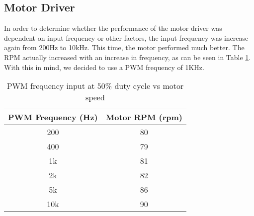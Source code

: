\subsection{Motor Driver}
In order to determine whether the performance of the motor driver was dependent on input frequency or other factors, the input frequency was increase again from 200Hz to 10kHz. This time, the motor performed much better. The RPM actually increased with an increase in frequency, as can be seen in Table \ref{tbl:freq-test}. With this in mind, we decided to use a PWM frequency of 1KHz.
\begin{table}[H]
	\centering
	\caption{PWM frequency input at 50\% duty cycle vs motor speed}
	\begin{tabular}{| c | c |}
		\hline
		PWM Frequency (Hz) & Motor RPM (rpm) \\
		\hline
		200 & 80 \\
		400 & 79 \\
		1k & 81 \\
		2k & 82 \\
		5k & 86 \\
		10k & 90 \\
		\hline
	\end{tabular}
	\label{tbl:freq-test}
\end{table}


